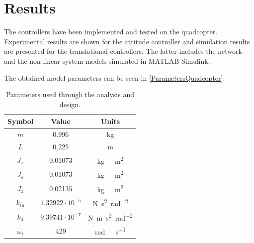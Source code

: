 \section{Results}\label{sec:results}
The controllers have been implemented and tested on the quadcopter. Experimental results are shown for the attitude controller and simulation results are presented for the translational controllers. The latter includes the network and the non-linear system models simulated in MATLAB Simulink.

The obtained model parameters can be seen in \autoref{ParametersQuadcopter}. 
\begin{table}[H]
    \centering
    \begin{tabular}{|c|c|c|}
    \hline
        \textbf{Symbol} &\textbf{Value} &\textbf{Units}\\
        \hline %
        $m$ & 0.996       &kg\\
        \hline %
        $L$  &   0.225       & m\\
        \hline %
        $J_x$  & 0.01073       & \si{kg \  m^2}\\
        \hline %
        $J_y$  & 0.01073       & \si{kg \  m^2}\\
        \hline %
        $J_z$  & 0.02135       & \si{kg \  m^2}\\
        \hline %
        $k_{\mathrm{th}}$  & $1.32922\cdot10^{-5}$       & \si{N s^2 rad^{-2}}\\
        \hline %
        $k_{\mathrm{d}}$  & $9.39741 \cdot10^{-7}$       & \si{N m s^2  rad^{-2}}\\
        \hline %
        $\overline{\omega}_i$& 429      & \si{rad \ s^{-1}}\\
        \hline
    \end{tabular}
    \caption{Parameters used through the analysis and design.}
    \label{ParametersQuadcopter}
\end{table}
